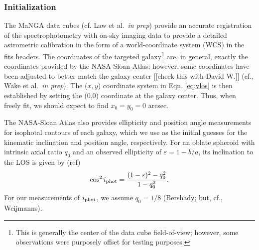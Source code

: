\documentclass[apj,iop,revtex4,numberedappendix]{emulateapj}
\begin{document}


\subsubsection{Initialization}
\label{sec:vfinit}

The MaNGA data cubes (cf. Law et al.~{\em in prep}) provide an accurate
registration of the spectrophotometry with on-sky imaging data to
provide a detailed astrometric calibration in the form of a
world-coordinate system (WCS) in the fits headers. The coordinates of
the targeted galaxy\footnote{
%
This is generally the center of the data cube field-of-view; however,
some observations were purposely offset for testing purposes.
%
} are, in general, exactly the coordinates provided by the NASA-Sloan
Atlas; however, some coordinates have been adjusted to better match the
galaxy center [[check this with David W.]] (cf., Wake et al.~{\em in
prep}).  The ($x,y$) coordinate system in Eqn. \ref{eq:vlos} is then
established by setting the (0,0) coordinate at the galaxy center.  Thus,
when freely fit, we should expect to find $x_0 = y_0 = 0$ arcsec.

The NASA-Sloan Atlas also provides ellipticity and position angle
measurements for isophotal contours of each galaxy, which we use as the
initial guesses for the kinematic inclination and position angle,
respectively.  For an oblate spheroid with intrinsic axial ratio $q_0$
and an observed ellipticity of $\varepsilon = 1-b/a$, its inclination to
the LOS is given by (ref)
%
\begin{equation}
%
\cos^2 i_{\rm phot} = \frac{ (1-\varepsilon)^2 - q_0^2 }{ 1 - q_0^2 }.
%
\label{eq:inc}
%
\end{equation}
%
For our measurements of $i_{\rm phot}$, we assume $q_0 = 1/8$ (Bershady;
but, cf., Weijmanns).
\end{document}
